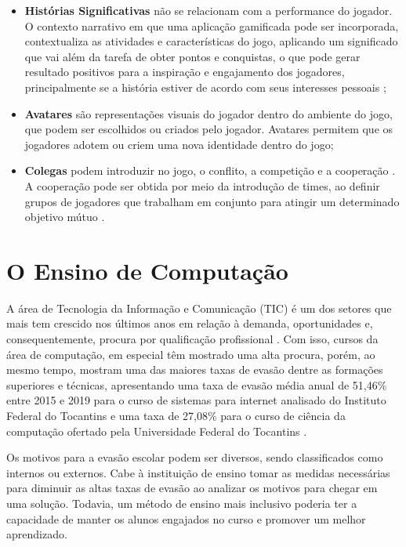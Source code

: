 \begin{itemize}
    \item \textbf{Histórias Significativas} não se relacionam com a performance do jogador. O contexto narrativo em que uma aplicação gamificada pode ser incorporada, contextualiza as atividades e características do jogo, aplicando um significado que vai além da tarefa de obter pontos e conquistas, o que pode gerar resultado positivos para a inspiração e engajamento dos jogadores, principalmente se a história estiver de acordo com seus interesses pessoais \cite{meaningful-gamification};
    \item \textbf{Avatares} são representações visuais do jogador dentro do ambiente do jogo, que podem ser escolhidos ou criados pelo jogador. Avatares permitem que os jogadores adotem ou criem uma nova identidade dentro do jogo;
    \item \textbf{Colegas} podem introduzir no jogo, o conflito, a competição e a cooperação \cite{kapp_gamification}. A cooperação pode ser obtida por meio da introdução de times, ao definir grupos de jogadores que trabalham em conjunto para atingir um determinado objetivo mútuo \cite{ranking_motivation}.
\end{itemize}

\section{O Ensino de Computação}

A área de Tecnologia da Informação e Comunicação (TIC) é um dos setores que mais tem crescido nos últimos anos em relação à demanda, oportunidades e, consequentemente, procura por qualificação profissional \cite{brasscom-tic}. Com isso, cursos da área de computação, em especial têm mostrado uma alta procura, porém, ao mesmo tempo, mostram uma das maiores taxas de evasão dentre as formações superiores e técnicas, apresentando uma taxa de evasão média anual de 51,46\% entre 2015 e 2019 para o curso de sistemas para internet analisado do Instituto Federal do Tocantins e uma taxa de 27,08\% para o curso de ciência da computação ofertado pela Universidade Federal do Tocantins \cite{evasao-computacao}.


Os motivos para a evasão escolar podem ser diversos, sendo classificados como internos ou externos. Cabe à instituição de ensino tomar as medidas necessárias para diminuir as altas taxas de evasão ao analizar os motivos para chegar em uma solução. Todavia, um método de ensino mais inclusivo poderia ter a capacidade de manter os alunos engajados no curso e promover um melhor aprendizado.

